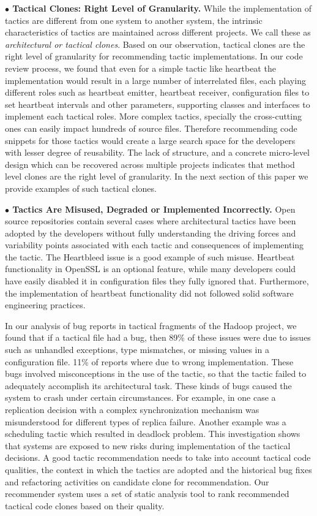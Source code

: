 \noindent \textbf{$\bullet$ Tactical Clones: Right Level of Granularity.}
While the implementation of tactics are different from one system to another system, the intrinsic characteristics of tactics are maintained across different projects. We call these as \emph{architectural or tactical clones}. Based on our observation, tactical clones are the right level of granularity for recommending tactic implementations.
In our code review process, we found that even for a simple tactic like heartbeat the implementation would result in a large number of interrelated files, each playing different roles such as heartbeat emitter, heartbeat receiver, configuration files to set heartbeat intervals and other parameters, supporting classes and interfaces to implement each  tactical roles. More complex tactics, specially the cross-cutting ones can easily impact hundreds of source files. Therefore recommending code snippets for those tactics would create a large search space for the developers with lesser degree of reusability. The lack of structure, and a concrete micro-level design which can be recovered across multiple projects indicates that method level clones are the right level of granularity.  In the next section of this paper we provide examples of such tactical clones.

\noindent \textbf{$\bullet$ Tactics Are Misused, Degraded or Implemented Incorrectly.} Open source repositories contain several cases where architectural tactics have been adopted by the developers without fully understanding the driving forces and variability points \cite{FSE2012} associated with each tactic and consequences of implementing the tactic. The Heartbleed issue is a good example of such misuse. Heartbeat functionality in OpenSSL is an optional feature, while many developers could have easily disabled it in configuration files they fully ignored that. Furthermore, the implementation of heartbeat functionality did not followed solid software engineering practices.

In our analysis of bug reports in tactical fragments of the Hadoop project, we found that if a tactical file had a bug, then 89\% of these issues were due to issues such as unhandled exceptions, type mismatches, or missing values in a configuration file. 
11\% of reports where due to wrong implementation. These bugs involved misconceptions in the use of the tactic, so that the tactic failed to adequately accomplish its architectural task.  These kinds of bugs caused the system to crash under certain circumstances. For example, in one case a replication decision with a complex synchronization mechanism was misunderstood for different types of replica failure. Another example was a scheduling tactic which resulted in deadlock problem. This investigation shows that systems are exposed to new risks during implementation of the tactical decisions. A good tactic recommendation needs to take into account tactical code qualities, the context in which the tactics are adopted and the historical bug fixes and refactoring activities on candidate clone for recommendation. Our recommender system uses a set of static analysis tool to rank recommended tactical code clones based on their quality.

